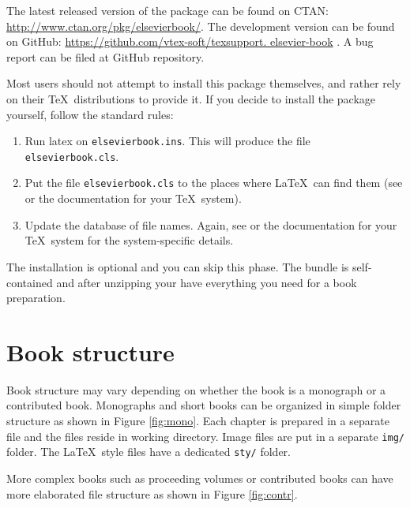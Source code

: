 \documentclass{ltxdoc}
\def\file#1{\texttt{#1}}
\begin{document}
The latest released version of the package can be found on CTAN: \linebreak
\url{http://www.ctan.org/pkg/elsevierbook/}. 
The development version can be found on GitHub: 
 \url{https://github.com/vtex-soft/texsupport. elsevier-book}%
. 
A bug report can be filed at GitHub repository. 

Most users should not attempt to install this package themselves, and rather rely on
their \TeX\ distributions to provide it. If you decide to install the package yourself, follow
the standard rules:
\begin{enumerate}
\item Run latex on \file{elsevierbook.ins}. This will produce the file \file{elsevierbook.cls}.
\item Put the file \file{elsevierbook.cls}  to the places where \LaTeX\ 
can find them (see \cite{ref1} or the documentation for your \TeX\ system).
\item Update the database of file names. Again, see \cite{ref1} or the documentation for your
\TeX\ system for the system-specific details.
\end{enumerate}


The installation is optional and you can skip this phase.
The bundle is self-contained and after unzipping your have everything you need for a book preparation. 


\section{Book structure}\label{bookstructure}

Book structure may vary depending on whether the book is a monograph or a contributed book. 
Monographs and short books can be organized in simple folder structure as shown in Figure 
\ref{fig:mono}.
Each chapter is prepared in a separate file and the files reside in working directory. 
Image files are put in a separate \file{img/} folder. 
The \LaTeX\ style files have a dedicated \file{sty/} folder.

More complex books such as proceeding volumes or contributed books can have more 
elaborated file structure as shown in Figure \ref{fig:contr}.
\end{document}
